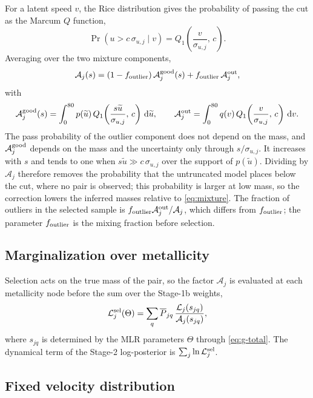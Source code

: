 For a latent speed $v$, the Rice distribution gives the probability of passing the cut as the Marcum $Q$ function,
\begin{equation}
 \Pr(u>c\,\sigma_{u,j}\mid v)=Q_1\!\left(\frac{v}{\sigma_{u,j}},\,c\right).
\end{equation}
Averaging over the two mixture components,
\begin{equation}
 \mathcal A_j(s)=(1-f_{\rm outlier})\,\mathcal A^{\rm good}_j(s)+f_{\rm outlier}\,\mathcal A^{\rm out}_j,
 \label{eq:pass}
\end{equation}
with
\begin{equation}
 \mathcal A^{\rm good}_j(s)=\int_0^{80}p(\widetilde u)\,
 Q_1\!\left(\frac{s\widetilde u}{\sigma_{u,j}},\,c\right)\,\mathrm{d}\widetilde u,
 \qquad
 \mathcal A^{\rm out}_j=\int_0^{80}q(v)\,
 Q_1\!\left(\frac{v}{\sigma_{u,j}},\,c\right)\,\mathrm{d} v .
\end{equation}
The pass probability of the outlier component does not depend on the mass, and $\mathcal A^{\rm good}_j$ depends on the mass and the uncertainty only through $s/\sigma_{u,j}$. It increases with $s$ and tends to one when $s\widetilde u\gg c\,\sigma_{u,j}$ over the support of $p(\widetilde u)$. Dividing by $\mathcal A_j$ therefore removes the probability that the untruncated model places below the cut, where no pair is observed; this probability is larger at low mass, so the correction lowers the inferred masses relative to \cref{eq:mixture}. The fraction of outliers in the selected sample is $f_{\rm outlier}\mathcal A^{\rm out}_j/\mathcal A_j$, which differs from $f_{\rm outlier}$; the parameter $f_{\rm outlier}$ is the mixing fraction before selection.

\subsection{Marginalization over metallicity}

Selection acts on the true mass of the pair, so the factor $\mathcal A_j$ is evaluated at each metallicity node before the sum over the Stage-1b weights,
\begin{equation}
 \mathcal L^{\rm sel}_j(\Theta)=\sum_q \overline P_{jq}\,
 \frac{\mathcal L_j(s_{jq})}{\mathcal A_j(s_{jq})},
 \label{eq:marginal}
\end{equation}
where $s_{jq}$ is determined by the MLR parameters $\Theta$ through \cref{eq:g-total}. The dynamical term of the Stage-2 log-posterior is $\sum_j\ln\mathcal L^{\rm sel}_j$.

\subsection{Fixed velocity distribution}

